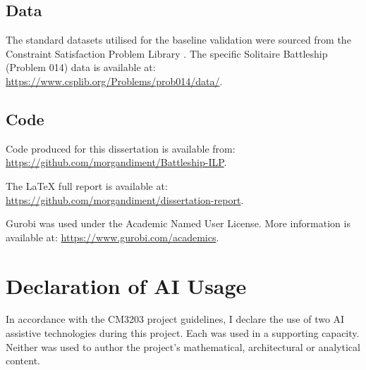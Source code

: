 \section{Data}\label{sec:data}
The standard datasets utilised for the baseline validation were sourced from the Constraint Satisfaction Problem Library \citep{csplib:prob014}. The specific Solitaire Battleship (Problem 014) data is available at: \url{https://www.csplib.org/Problems/prob014/data/}.

\section{Code}\label{sec:code}
Code produced for this dissertation is available from: \url{https://github.com/morgandiment/Battleship-ILP}.

The LaTeX full report is available at: \url{https://github.com/morgandiment/dissertation-report}.

Gurobi \citep{gurobi2024} was used under the Academic Named User License. More information is available at: \url{https://www.gurobi.com/academics}. 

\chapter{Declaration of AI Usage}\label{chap:ai-declaration}

In accordance with the CM3203 project guidelines, I declare the use of two AI assistive technologies during this project. Each was used in a supporting capacity. Neither was used to author the project's mathematical, architectural or analytical content.

